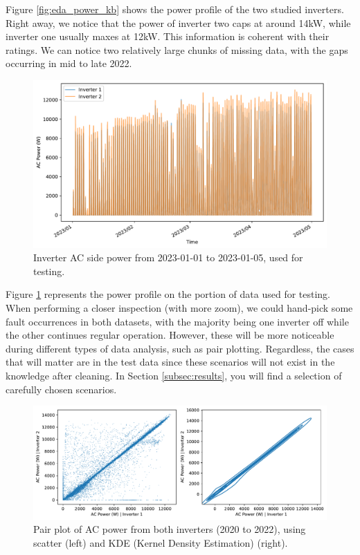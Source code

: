 Figure \ref{fig:eda_power_kb} shows the power profile of the two studied inverters. Right away, we notice that the power of inverter two caps at around 14kW, while inverter one usually maxes at 12kW. This information is coherent with their ratings. We can notice two relatively large chunks of missing data, with the gaps occurring in mid to late 2022.

\begin{figure}[h!]
    \centering
    \includegraphics[width=\textwidth]{figures/chapter5/analysis/01_power_test.pdf}
    \caption{Inverter AC side power from 2023-01-01 to 2023-01-05, used for testing.}
    \label{fig:eda_power_test}
\end{figure}

Figure \ref{fig:eda_power_test} represents the power profile on the portion of data used for testing. When performing a closer inspection (with more zoom), we could hand-pick some fault occurrences in both datasets, with the majority being one inverter off while the other continues regular operation. However, these will be more noticeable during different types of data analysis, such as pair plotting. Regardless, the cases that will matter are in the test data since these scenarios will not exist in the knowledge after cleaning. In Section \ref{subsec:results}, you will find a selection of carefully chosen scenarios.

\begin{figure}[h!]
    \centering
    \includegraphics[width=\textwidth]{figures/chapter5/analysis/02_power_pairplots_kb.pdf}
    \caption{Pair plot of AC power from both inverters (2020 to 2022), using scatter (left) and KDE (Kernel Density Estimation) (right).}
    \label{fig:eda_power_kb_pair}
\end{figure}

